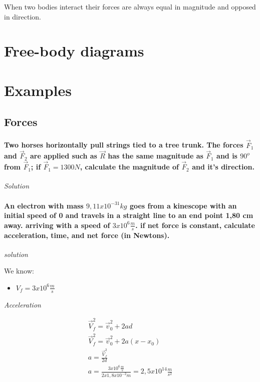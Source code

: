 \documentclass[11pt,fleqn]{book} %
\begin{document}
When two bodies interact their forces are always equal in magnitude and
opposed in direction.

\section{Free-body diagrams}

\section{Examples}
\subsection{Forces}

\paragraph{Two horses horizontally pull strings tied
to a tree trunk. The forces $\vec{F}_1$ and $\vec{F}_2$
are applied such as  $\vec{R}$ has the same magnitude as $\vec{F}_1$ 
and is $90^o$ from $\vec{F}_1$; if $\vec{F}_1 = 1300N$, calculate
the magnitude of $\vec{F}_2$ and it's direction.}

\textit{Solution}

\paragraph*{An electron with mass $9,11x10^{-31} kg$ goes from
a kinescope with an initial speed of 0 and travels in a straight line to
an end point 1,80 cm away. arriving with a speed of $ 3x10^{6} \frac{m}{s} $.
if net force is constant, calculate acceleration, time, and net force (in Newtons).}

\textit{solution}

We know:
\begin{itemize}
    \item $ V_f = 3x10^6 \frac{m}{s} $
\end{itemize}
\textit{Acceleration}

\begin{gather}
    \vec{V}_f^2 = \vec{v}_0^2 + 2ad\\
    \vec{V}_f^2 = \vec{v}_0^2 + 2a(x-x_0) \\
    a = \frac{\vec{V}_f^2}{2d}\\
    a = \frac{3x10^6 \frac{m}{s}}{2 x 1,8x10^{-2}m} = 2,5x10^{14} \frac{m}{s^2}
\end{gather}
\end{document}
